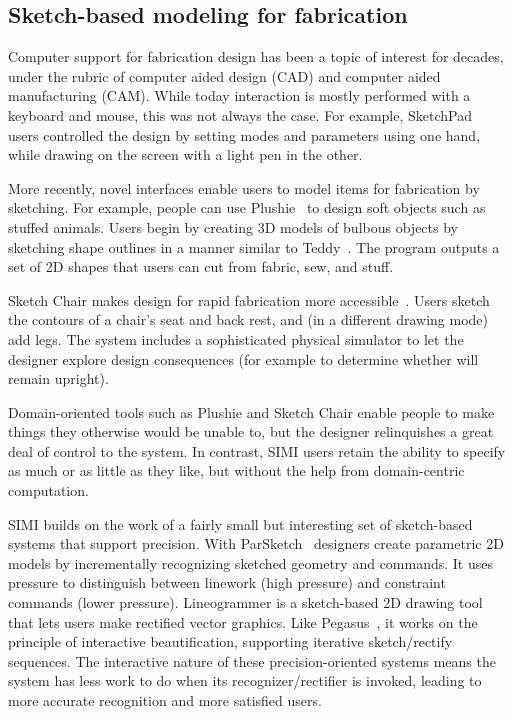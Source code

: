 \documentclass{article}
\begin{document}
\subsection{Sketch-based modeling for fabrication}

Computer support for fabrication design has been a topic of interest
for decades, under the rubric of computer aided design (CAD) and
computer aided manufacturing (CAM). While today interaction is mostly
performed with a keyboard and mouse, this was not always the case. For
example, SketchPad~\cite{sutherland-sketchpad} users controlled the
design by setting modes and parameters using one hand, while drawing
on the screen with a light pen in the other.

More recently, novel interfaces enable users to model items for
fabrication by sketching. For example, people can use
Plushie~\cite{mori-plushie} to design soft objects such as stuffed
animals. Users begin by creating 3D models of bulbous objects by
sketching shape outlines in a manner similar to
Teddy~\cite{igarashi-teddy}. The program outputs a set of 2D shapes
that users can cut from fabric, sew, and stuff.

Sketch Chair makes design for rapid fabrication more
accessible~\cite{saul-sketch-chair}. Users sketch the contours of a
chair's seat and back rest, and (in a different drawing mode) add
legs. The system includes a sophisticated physical simulator to let
the designer explore design consequences (for example to determine
whether will remain upright).

Domain-oriented tools such as Plushie and Sketch Chair enable people
to make things they otherwise would be unable to, but the designer
relinquishes a great deal of control to the system. In contrast, SIMI
users retain the ability to specify as much or as little as they like,
but without the help from domain-centric computation.


SIMI builds on the work of a fairly small but interesting set of
sketch-based systems that support precision. With
ParSketch~\cite{naya-parsketch} designers create parametric 2D models
by incrementally recognizing sketched geometry and commands. It uses
pressure to distinguish between linework (high pressure) and
constraint commands (lower
pressure). Lineogrammer\cite{zeleznik-lineogrammer} is a sketch-based
2D drawing tool that lets users make rectified vector graphics. Like
Pegasus~\cite{igarashi-pegasus}, it works on the principle of
interactive beautification, supporting iterative sketch/rectify
sequences. The interactive nature of these precision-oriented systems
means the system has less work to do when its recognizer/rectifier is
invoked, leading to more accurate recognition and more satisfied
users.
\end{document}
